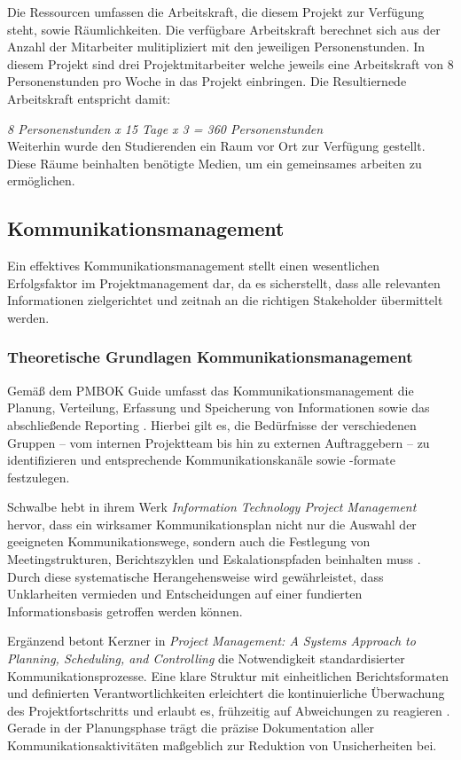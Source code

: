 \documentclass[ThesisDJ.tex]{subfiles}
\begin{document}
Die Ressourcen umfassen die Arbeitskraft, die diesem Projekt zur Verfügung steht, sowie Räumlichkeiten. 
Die verfügbare Arbeitskraft berechnet sich aus der Anzahl der Mitarbeiter mulitipliziert mit den jeweiligen Personenstunden.
In diesem Projekt sind drei Projektmitarbeiter welche jeweils eine Arbeitskraft von 8 Personenstunden pro Woche in das Projekt einbringen. 
Die Resultiernede Arbeitskraft entspricht damit:

		\emph{8 Personenstunden x 15 Tage x 3 = 360 Personenstunden}\\
Weiterhin wurde den Studierenden ein Raum vor Ort zur Verfügung gestellt. Diese Räume beinhalten benötigte Medien, um ein gemeinsames arbeiten zu ermöglichen.

\subsection{Kommunikationsmanagement}
Ein effektives Kommunikationsmanagement stellt einen wesentlichen Erfolgsfaktor im Projektmanagement dar, da es sicherstellt, dass alle relevanten Informationen zielgerichtet und zeitnah an die richtigen Stakeholder übermittelt werden.

\subsubsection{Theoretische Grundlagen Kommunikationsmanagement}
 Gemäß dem PMBOK Guide umfasst das Kommunikationsmanagement die Planung, Verteilung, Erfassung und Speicherung von Informationen sowie das abschließende Reporting \cite{PMI2017PMBOK}. Hierbei gilt es, die Bedürfnisse der verschiedenen Gruppen – vom internen Projektteam bis hin zu externen Auftraggebern – zu identifizieren und entsprechende Kommunikationskanäle sowie -formate festzulegen.

Schwalbe hebt in ihrem Werk \emph{Information Technology Project Management} hervor, dass ein wirksamer Kommunikationsplan nicht nur die Auswahl der geeigneten Kommunikationswege, sondern auch die Festlegung von Meetingstrukturen, Berichtszyklen und Eskalationspfaden beinhalten muss \cite{Schwalbe}. Durch diese systematische Herangehensweise wird gewährleistet, dass Unklarheiten vermieden und Entscheidungen auf einer fundierten Informationsbasis getroffen werden können.

Ergänzend betont Kerzner in \emph{Project Management: A Systems Approach to Planning, Scheduling, and Controlling} die Notwendigkeit standardisierter Kommunikationsprozesse. Eine klare Struktur mit einheitlichen Berichtsformaten und definierten Verantwortlichkeiten erleichtert die kontinuierliche Überwachung des Projektfortschritts und erlaubt es, frühzeitig auf Abweichungen zu reagieren \cite{Kerzner}. Gerade in der Planungsphase trägt die präzise Dokumentation aller Kommunikationsaktivitäten maßgeblich zur Reduktion von Unsicherheiten bei.
\end{document}
